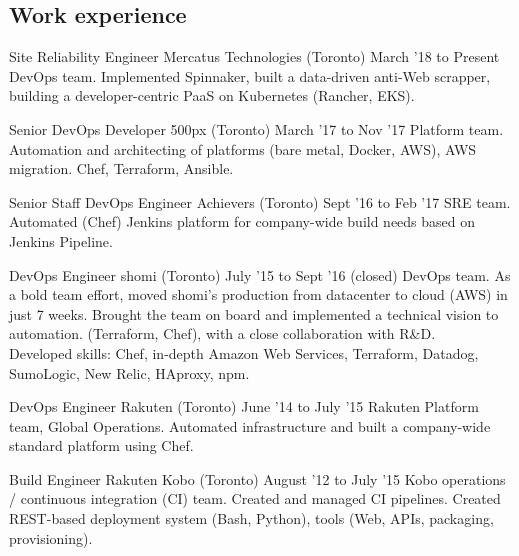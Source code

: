 \documentclass[]{cvpn}
\begin{document}
\cvheader{}

\begin{multicols}{2}
\section{Work experience}
\begin{eventlist}

\item{Site Reliability Engineer}
     {Mercatus Technologies (Toronto)}
     {March '18 to Present}
{
DevOps team.
Implemented Spinnaker,
built a data-driven anti-Web scrapper,
building a developer-centric PaaS on Kubernetes
(Rancher, EKS).
}

\item{Senior DevOps Developer}
     {500px (Toronto)}
     {March '17 to Nov '17}
{
Platform team.
Automation and architecting of platforms
(bare metal, Docker, AWS),
AWS migration. Chef, Terraform, Ansible.
}

\item{Senior Staff DevOps Engineer}
     {Achievers (Toronto)}
     {Sept '16 to Feb '17}
{
SRE team.
Automated (Chef) Jenkins platform for company-wide build
needs based on Jenkins Pipeline.
}

\item{DevOps Engineer}
     {shomi (Toronto)}
     {July '15 to Sept '16 (closed)}
{
DevOps team. As a bold team effort, moved shomi's
production from datacenter to cloud (AWS) in just 7 weeks.
Brought the team on board and implemented a technical
vision to automation. (Terraform, Chef),
with a close collaboration with R\&D.\\

Developed skills: Chef, in-depth Amazon Web Services,
Terraform, Datadog, SumoLogic, New Relic, HAproxy, npm.
}

\item{DevOps Engineer}
     {Rakuten (Toronto)}
     {June '14 to July '15}
{
Rakuten Platform team, Global Operations.
Automated infrastructure and built a company-wide
standard platform using Chef.
}

\item{Build Engineer}
     {Rakuten Kobo (Toronto)}
     {August '12 to July '15}
{
Kobo operations / continuous integration (CI) team.
Created and managed CI pipelines.
Created REST-based deployment system (Bash, Python),
tools (Web, APIs, packaging, provisioning).\\

}
\end{eventlist}
\end{multicols}
\end{document}
